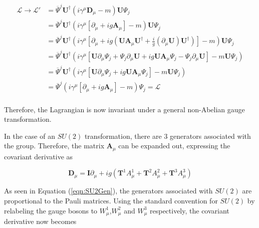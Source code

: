 \documentclass{article}
\begin{document}
\begin{equation}
\begin{split}
\mathcal{L}\rightarrow\mathcal{L'} & = \overline{\Psi}^j\bm{U}^\dagger \left( i \gamma^\mu \bm{D}_\mu -m \right)\bm{U}\Psi_j \\
& = \overline{\Psi}^j \bm{U}^\dagger \left( i \gamma^\mu [\partial_\mu + ig\bm{A}_\mu] - m \right)\bm{U}\Psi_j \\
& = \overline{\Psi}^j \bm{U}^\dagger \left( i \gamma^\mu \left[\partial_\mu +ig\left(\bm{U}\bm{A}_\mu\bm{U}^\dagger + \frac{i}{g}(\partial_\mu \bm{U})\bm{U}^\dagger\right)\right] - m  \right)\bm{U}\Psi_j \\
& = \overline{\Psi}^j \bm{U}^\dagger \left( i \gamma^\mu \left[ \bm{U}\partial_\mu\Psi_j + \Psi_j\partial_\mu\bm{U} + ig\bm{U}\bm{A}_\mu\Psi_j - \Psi_j\partial_\mu\bm{U} \right] - m \bm{U}\Psi_j \right)\\
& = \overline{\Psi}^j \bm{U}^\dagger \left( i \gamma^\mu \left[ \bm{U}\partial_\mu\Psi_j + ig\bm{U}\bm{A}_\mu\Psi_j \right] - m \bm{U}\Psi_j \right)\\
& = \overline{\Psi}^j \left( i \gamma^\mu \left[ \partial_\mu + ig\bm{A}_\mu \right] - m \right)\Psi_j = \mathcal{L}\\
\end{split}
\end{equation}

Therefore, the Lagrangian is now invariant under a general non-Abelian gauge transformation. 

In the case of an $SU(2)$ transformation, there are 3 generators associated with the group. Therefore, the matrix $\bm{A}_\mu$ can be expanded out, expressing the covariant derivative as

\begin{equation}
\bm{D}_\mu = \bm{I}\partial_\mu + ig(\bm{T}^1 A^{1}_\mu + \bm{T}^2 A^{2}_\mu + \bm{T}^3 A^{3}_\mu)
\end{equation}

As seen in Equation (\ref{eqn:SU2Gen}), the generators associated with $SU(2)$ are proportional to the Pauli matrices. Using the standard convention for $SU(2)$ by relabeling the gauge bosons to $W^{1}_\mu$,$W^{2}_\mu$ and $W^{3}_\mu$ respectively, the covariant derivative now becomes
\end{document}
